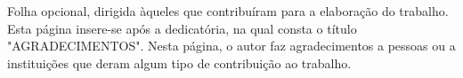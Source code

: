 \begin{agradecimentos}
Folha opcional, dirigida àqueles que contribuíram para a elaboração do trabalho. Esta página insere-se após a dedicatória, na qual consta o título "AGRADECIMENTOS". Nesta página, o autor faz agradecimentos a pessoas ou a instituições que deram algum tipo de contribuição ao trabalho.

\end{agradecimentos}
